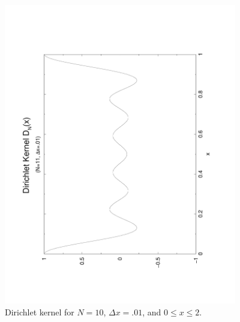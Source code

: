\documentclass{article}
\begin{document}
%
\begin{figure}[htb!]
\begin{center}
\noindent\includegraphics[angle=-90,width=4in]{fig2}
\caption{\label{f:fig3}
Dirichlet kernel for $N=10$, $\Delta x =.01$, and $0\le x\le 2$.}
\end{center}
\end{figure}
%
\end{document}
